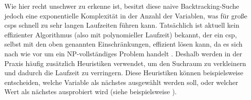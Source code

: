 Wie hier recht unschwer zu erkenne ist, besitzt diese naive Backtracking-Suche jedoch eine exponentielle Komplexität in der Anzahl der Variablen,
was für große \acp*{csp} schnell zu sehr langen Laufzeiten führen kann. Tatsächlich ist aktuell kein effizienter Algorithmus (also mit polynomieller Laufzeit) bekannt, der ein
\ac*{csp}, selbst mit den oben genannten Einschränkungen, effizient lösen kann, da es sich nach wie vor um ein NP-vollständiges Problem handelt \cite{BestCSPSearch}. Deshalb
werden in der Praxis häufig zusätzlich Heuristiken verwendet, um den Suchraum zu verkleinern und dadurch die Laufzeit zu verringern. Diese Heuristiken können beispielsweise
entscheiden, welche Variable als nächstes ausgewählt werden soll, oder welcher Wert als nächstes ausprobiert wird (siehe beispielsweise \cite{OrderingHeuristics}).

